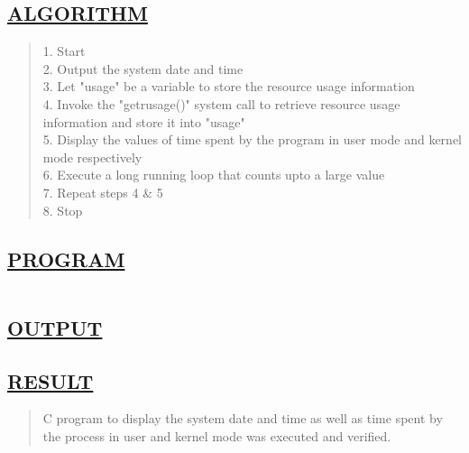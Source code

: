 \documentclass[a4paper, 12pt]{article}
\begin{document}
\subsection*{\underline{ALGORITHM}}
\begin{quote}
1. Start\\
2. Output the system date and time\\
3. Let "usage" be a variable to store the resource usage information\\
4. Invoke the "getrusage()" system call to retrieve resource usage information and store \hspace*{0.4cm} it into "usage"\\
5. Display the values of time spent by the program in user mode and kernel mode \hspace*{1cm}  respectively\\
6. Execute a long running loop that counts upto a large value\\
7. Repeat steps 4 \& 5\\
8. Stop\\
\end{quote}

\subsection*{\underline{PROGRAM}}
\begin{quote}
\inputminted[fontsize=\small,breaklines,breakanywhere]{c}{system_time_usage.c}
\end{quote}

\newpage
\subsection*{\underline{OUTPUT}}

\begin{figure}[H] 
    \centering
\end{figure}


\subsection*{\underline{RESULT}}
\begin{quote}
C program to display the system date and time as well as time spent by the process in user and kernel mode was executed and verified.
\end{quote}
\end{document}
